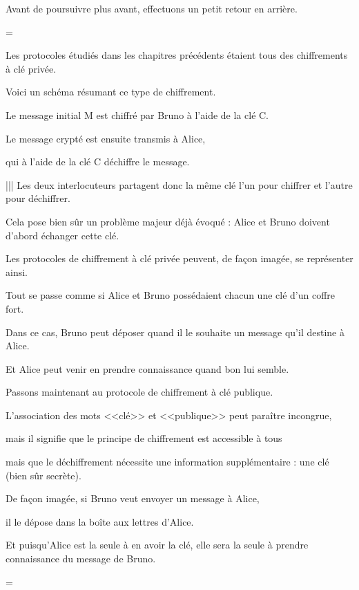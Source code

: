 \diapo

Avant de poursuivre plus avant, effectuons un petit retour en arrière.

=

Les protocoles étudiés dans les chapitres précédents étaient tous 
des chiffrements à clé privée.

Voici un schéma résumant ce type de chiffrement.

Le message initial M est chiffré par Bruno à l'aide de la clé C.

Le message crypté est ensuite transmis à Alice,

qui à l'aide de la clé C déchiffre le message.


||| Les deux interlocuteurs partagent donc la même clé l'un pour chiffrer et l'autre pour déchiffrer.

Cela pose bien sûr un problème majeur déjà évoqué : Alice et Bruno doivent d'abord échanger cette clé.


\diapo

Les protocoles de chiffrement à clé privée peuvent, de façon imagée, se représenter ainsi.

Tout se passe comme si Alice et Bruno possédaient chacun une clé d'un coffre fort.

Dans ce cas, Bruno peut déposer quand il le souhaite un message qu'il destine à Alice.

Et Alice peut venir en prendre connaissance quand bon lui semble.

\diapo

Passons maintenant au protocole de chiffrement à clé publique. 


L'association des mots <<clé>> et <<publique>> peut paraître incongrue, 

mais il signifie que le principe de chiffrement est accessible à tous 

mais que le déchiffrement nécessite une information supplémentaire : une clé (bien sûr secrète).


De façon imagée, si Bruno veut envoyer un message à Alice,

il le dépose dans la boîte aux lettres d'Alice. 

Et puisqu'Alice est la seule à en avoir la clé, elle sera la seule à prendre connaissance du message de Bruno.

=

